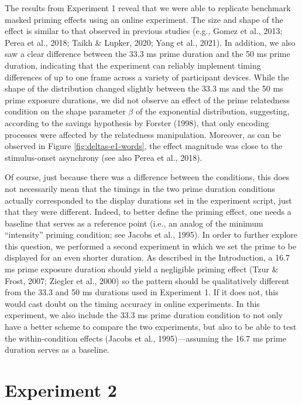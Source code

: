 \documentclass[
  english,
  man,floatsintext]{apa6}
\begin{document}
The results from Experiment 1 reveal that we were able to replicate benchmark masked priming effects using an online experiment. The size and shape of the effect is similar to that observed in previous studies (e.g., Gomez et al., 2013; Perea et al., 2018; Taikh \& Lupker, 2020; Yang et al., 2021). In addition, we also saw a clear difference between the 33.3 ms prime duration and the 50 ms prime duration, indicating that the experiment can reliably implement timing differences of up to one frame across a variety of participant devices. While the shape of the distribution changed slightly between the 33.3 ms and the 50 ms prime exposure durations, we did not observe an effect of the prime relatedness condition on the shape parameter \(\beta\) of the exponential distribution, suggesting, according to the savings hypothesis by Forster (1998), that only encoding processes were affected by the relatedness manipulation. Moreover, as can be observed in Figure \ref{fig:deltas-e1-words}, the effect magnitude was close to the stimulus-onset asynchrony (see also Perea et al., 2018).

Of course, just because there was a difference between the conditions, this does not necessarily mean that the timings in the two prime duration conditions actually corresponded to the display durations set in the experiment script, just that they were different. Indeed, to better define the priming effect, one needs a baseline that serves as a reference point (i.e., an analog of the minimum {``intensity''} priming condition; see Jacobs et al., 1995). In order to further explore this question, we performed a second experiment in which we set the prime to be displayed for an even shorter duration. As described in the Introduction, a 16.7 ms prime exposure duration should yield a negligible priming effect (Tzur \& Frost, 2007; Ziegler et al., 2000) so the pattern should be qualitatively different from the 33.3 and 50 ms durations used in Experiment 1. If it does not, this would cast doubt on the timing accuracy in online experiments. In this experiment, we also include the 33.3 ms prime duration condition to not only have a better scheme to compare the two experiments, but also to be able to test the within-condition effects (Jacobs et al., 1995)---assuming the 16.7 ms prime duration serves as a baseline.

\hypertarget{experiment-2}{%
\section{Experiment 2}\label{experiment-2}}
\end{document}
